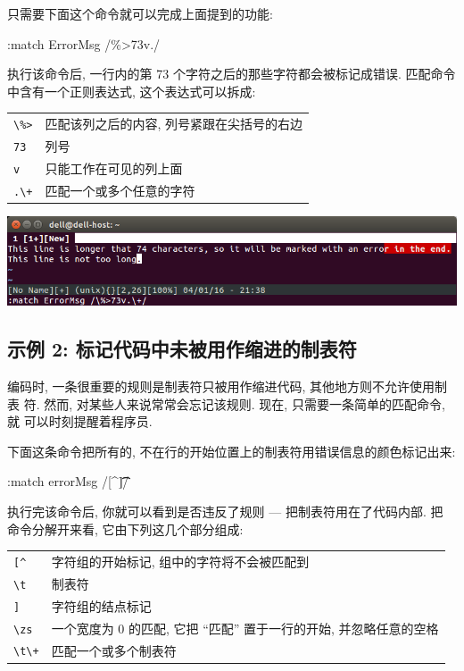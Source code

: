 只需要下面这个命令就可以完成上面提到的功能:
\begin{vimcmd}
:match ErrorMsg /\%>73v.\+/
\end{vimcmd}
执行该命令后, 一行内的第 73 个字符之后的那些字符都会被标记成错误. 匹配命令 
中含有一个正则表达式, 这个表达式可以拆成:
\begin{center}
\begin{tabular}{ll}
    \hline
    \verb'\%>'  & 匹配该列之后的内容, 列号紧跟在尖括号的右边 \\
    \verb'73'   & 列号  \\
    \verb'v'    & 只能工作在可见的列上面 \\
    \verb'.\+'  & 匹配一个或多个任意的字符 \\
    \hline
\end{tabular}
\end{center}
\begin{center}
    \includegraphics[scale=0.6]{./images/page24.png}
\end{center}
\subsection{示例 2: 标记代码中未被用作缩进的制表符}
\label{subsec:mark_tabs_not_used_for_indentation_in_code}
编码时, 一条很重要的规则是制表符只被用作缩进代码, 其他地方则不允许使用制表
符. 然而, 对某些人来说常常会忘记该规则. 现在, 只需要一条简单的匹配命令, 就
可以时刻提醒着程序员.

下面这条命令把所有的, 不在行的开始位置上的制表符用错误信息的颜色标记出来:
\begin{vimcmd}
:match errorMsg /[^\t]\zs\t\+/
\end{vimcmd}
执行完该命令后, 你就可以看到是否违反了规则 --- 把制表符用在了代码内部. 把
命令分解开来看, 它由下列这几个部分组成:
\begin{center}
    \begin{tabular}{ll}
        \hline
        \verb'[^'   & 字符组的开始标记, 组中的字符将不会被匹配到 \\
        \verb'\t'   & 制表符 \\
        \verb']'    & 字符组的结点标记 \\
        \verb'\zs'  & 一个宽度为 0 的匹配, 它把 ``匹配'' 置于一行的开始,
        并忽略任意的空格 \\
        \verb'\t\+' & 匹配一个或多个制表符 \\
        \hline
    \end{tabular}
\end{center}

